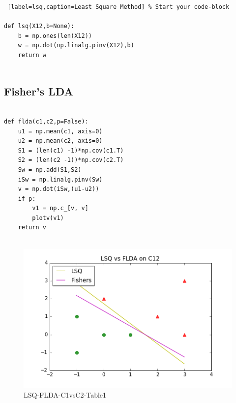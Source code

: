 \documentclass[10pt,a4paper]{article}
\begin{document}
\begin{lstlisting} [label=lsq,caption=Least Square Method] % Start your code-block

def lsq(X12,b=None):
    b = np.ones(len(X12))
    w = np.dot(np.linalg.pinv(X12),b)
    return w  


\end{lstlisting}
\vfill
\subsection{Fisher's LDA}


\lstset{%
basicstyle=\small, %
identifierstyle=, %
stringstyle=\ttfamily, %
showstringspaces=false} %

\lstset{language=Python}          %

\begin{lstlisting}[label=flda,caption=Fisher's Linear Discriminant]  % Start your code-block

def flda(c1,c2,p=False):
    u1 = np.mean(c1, axis=0)
    u2 = np.mean(c2, axis=0)
    S1 = (len(c1) -1)*np.cov(c1.T)
    S2 = (len(c2 -1))*np.cov(c2.T)
    Sw = np.add(S1,S2)
    iSw = np.linalg.pinv(Sw)
    v = np.dot(iSw,(u1-u2))
    if p:
        v1 = np.c_[v, v]
        plotv(v1)
    return v
    
\end{lstlisting}
\vfill
\graphicspath{ {/images/} }
\begin{figure}[!h]
\includegraphics[scale=0.75]{images/LsqvsFLDA_C12.png}	
  \caption{LSQ-FLDA-C1vsC2-Table1}
  \label{fig:C34T2}
\end{figure}
\end{document}
